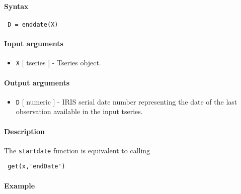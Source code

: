


	\paragraph{Syntax}
 
 \begin{verbatim}
 D = enddate(X)
 \end{verbatim}
 
 \paragraph{Input arguments}
 
 \begin{itemize}
 \item
   \texttt{X} {[} tseries {]} - Tseries object.
 \end{itemize}
 
 \paragraph{Output arguments}
 
 \begin{itemize}
 \item
   \texttt{D} {[} numeric {]} - IRIS serial date number representing the
   date of the last observation available in the input tseries.
 \end{itemize}
 
 \paragraph{Description}
 
 The \texttt{startdate} function is equivalent to calling
 
 \begin{verbatim}
 get(x,'endDate')
 \end{verbatim}
 
 \paragraph{Example}


